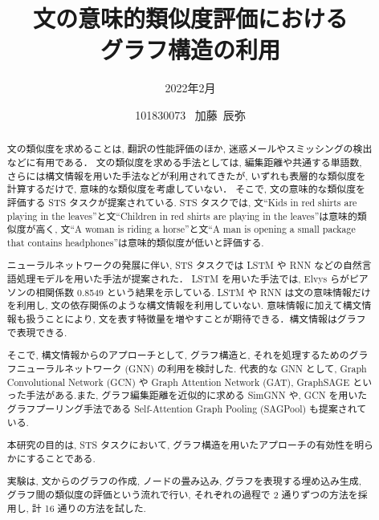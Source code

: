 \documentclass[a4paper,12pt,dvipdfmx]{thesis} %
\title{文の意味的類似度評価における\\グラフ構造の利用}
\author{2022年2月}
\date{101830073 \, 加藤~辰弥}
\begin{document}
\maketitle

\setcounter{tocdepth}{2}

\setlength{\baselineskip}{1.85zw}
\setlength{\textheight}{31\baselineskip}

\setlength{\baselineskip}{1.63zw}
\setlength{\textheight}{36\baselineskip}


\begin{abstract}
	文の類似度を求めることは, 翻訳の性能評価のほか, 迷惑メールやスミッシングの検出などに有用である．
	文の類似度を求める手法としては, 編集距離や共通する単語数, さらには構文情報を用いた手法などが利用されてきたが, いずれも表層的な類似度を計算するだけで, 意味的な類似度を考慮していない．
	そこで, 文の意味的な類似度を評価する STS タスクが提案されている.
	STS タスクでは, 文``Kids in red shirts are playing in the leaves''と文``Children in red shirts are playing in the leaves''は意味的類似度が高く, 文``A woman is riding a horse''と文``A man is opening a small package that contains headphones''は意味的類似度が低いと評価する.
	\par
	ニューラルネットワークの発展に伴い, STS タスクでは LSTM や RNN などの自然言語処理モデルを用いた手法が提案された．
	LSTM を用いた手法では, Elvys らがピアソンの相関係数 0.8549 という結果を示している.
	LSTM や RNN は文の意味情報だけを利用し, 文の依存関係のような構文情報を利用していない.
	意味情報に加えて構文情報も扱うことにより, 文を表す特徴量を増やすことが期待できる．構文情報はグラフで表現できる.
	\par そこで, 構文情報からのアプローチとして, グラフ構造と, それを処理するためのグラフニューラルネットワーク (GNN) の利用を検討した.
	代表的な GNN として, Graph Convolutional Network (GCN) や Graph Attention Network (GAT), GraphSAGE といった手法がある.また, グラフ編集距離を近似的に求める SimGNN や, GCN を用いたグラフプーリング手法である Self-Attention Graph Pooling (SAGPool) も提案されている.
	\par 本研究の目的は, STS タスクにおいて, グラフ構造を用いたアプローチの有効性を明らかにすることである.
	\par 実験は, 文からのグラフの作成, ノードの畳み込み, グラフを表現する埋め込み生成, グラフ間の類似度の評価という流れで行い, それぞれの過程で 2 通りずつの方法を採用し, 計 16 通りの方法を試した.

\end{abstract}
\end{document}
